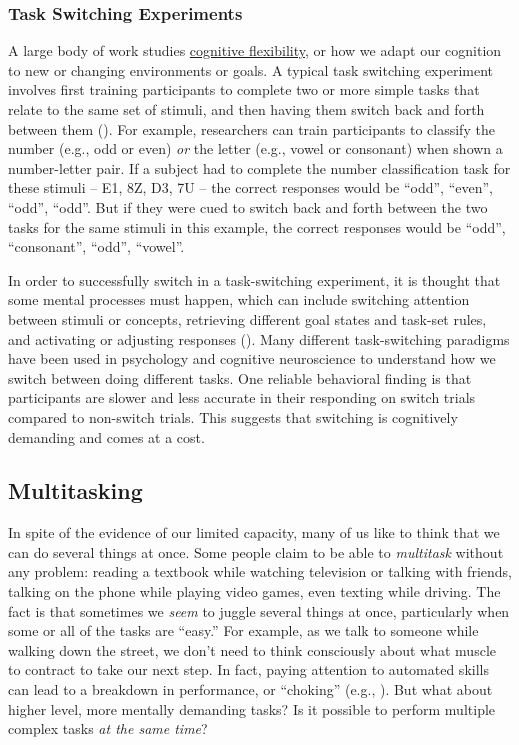 \documentclass[
]{krantz}
\begin{document}
\subsubsection*{Task Switching Experiments}\label{task-switching-experiments}


A large body of work studies \hyperref[cognitive-flexibility]{cognitive flexibility}, or how we adapt our cognition to new or changing environments or goals. A typical task switching experiment involves first training participants to complete two or more simple tasks that relate to the same set of stimuli, and then having them switch back and forth between them (). For example, researchers can train participants to classify the number (e.g., odd or even) \emph{or} the letter (e.g., vowel or consonant) when shown a number-letter pair. If a subject had to complete the number classification task for these stimuli -- E1, 8Z, D3, 7U -- the correct responses would be ``odd'', ``even'', ``odd'', ``odd''. But if they were cued to switch back and forth between the two tasks for the same stimuli in this example, the correct responses would be ``odd'', ``consonant'', ``odd'', ``vowel''.

In order to successfully switch in a task-switching experiment, it is thought that some mental processes must happen, which can include switching attention between stimuli or concepts, retrieving different goal states and task-set rules, and activating or adjusting responses (). Many different task-switching paradigms have been used in psychology and cognitive neuroscience to understand how we switch between doing different tasks. One reliable behavioral finding is that participants are slower and less accurate in their responding on switch trials compared to non-switch trials. This suggests that switching is cognitively demanding and comes at a cost.

\subsection*{Multitasking}\label{multitasking}


In spite of the evidence of our limited capacity, many of us like to think that we can do several things at once. Some people claim to be able to \emph{multitask} without any problem: reading a textbook while watching television or talking with friends, talking on the phone while playing video games, even texting while driving. The fact is that sometimes we \emph{seem} to juggle several things at once, particularly when some or all of the tasks are ``easy.'' For example, as we talk to someone while walking down the street, we don't need to think consciously about what muscle to contract to take our next step. In fact, paying attention to automated skills can lead to a breakdown in performance, or ``choking'' (e.g., ). But what about higher level, more mentally demanding tasks? Is it possible to perform multiple complex tasks \emph{at the same time}?
\end{document}
